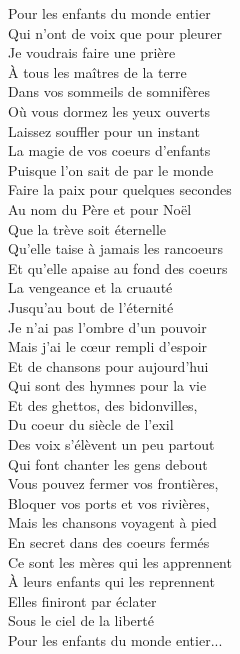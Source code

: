 \documentclass{novel}
\begin{document}
\begin{multicols}{2}
Pour les enfants du monde entier \\
Qui n'ont de voix que pour pleurer \\
Je voudrais faire une prière \\
À tous les maîtres de la terre \\

Dans vos sommeils de somnifères \\
Où vous dormez les yeux ouverts \\
Laissez souffler pour un instant \\
La magie de vos coeurs d'enfants \\

Puisque l'on sait de par le monde \\
Faire la paix pour quelques secondes \\
Au nom du Père et pour Noël \\
Que la trève soit éternelle \\

Qu'elle taise à jamais les rancoeurs \\
Et qu'elle apaise au fond des coeurs \\
La vengeance et la cruauté \\
Jusqu'au bout de l'éternité \\

Je n'ai pas l'ombre d'un pouvoir \\
Mais j'ai le cœur rempli d'espoir \\
Et de chansons pour aujourd'hui \\
Qui sont des hymnes pour la vie \\

Et des ghettos, des bidonvilles, \\
Du coeur du siècle de l'exil \\
Des voix s'élèvent un peu partout \\
Qui font chanter les gens debout \\

Vous pouvez fermer vos frontières, \\
Bloquer vos ports et vos rivières, \\
Mais les chansons voyagent à pied \\
En secret dans des coeurs fermés \\

Ce sont les mères qui les apprennent \\
À leurs enfants qui les reprennent \\
Elles finiront par éclater \\
Sous le ciel de la liberté \\

Pour les enfants du monde entier...
\end{multicols}
\end{document}
